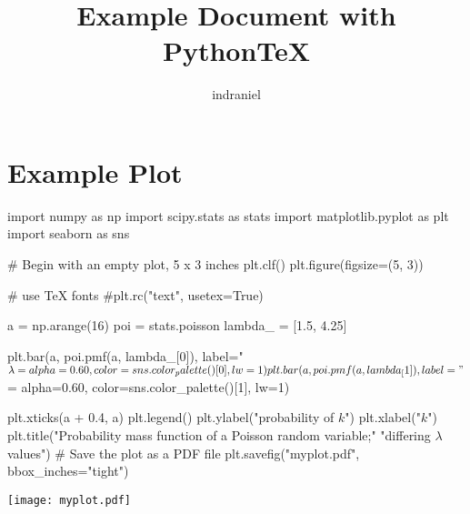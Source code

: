\documentclass{article}
\title{Example Document with Python\TeX}
\author{indraniel}
\begin{document}
\maketitle

\section{Example Plot}

\begin{pycode}
import numpy as np
import scipy.stats as stats
import matplotlib.pyplot as plt
import seaborn as sns

# Begin with an empty plot, 5 x 3 inches
plt.clf()
plt.figure(figsize=(5, 3))

# use TeX fonts
#plt.rc("text", usetex=True)

a = np.arange(16)
poi = stats.poisson
lambda_ = [1.5, 4.25]

plt.bar(a, poi.pmf(a, lambda_[0]),
        label="$\lambda = %
        alpha=0.60,
        color=sns.color_palette()[0],
        lw=1)

plt.bar(a, poi.pmf(a, lambda_[1]),
        label="$\lambda = %
        alpha=0.60,
        color=sns.color_palette()[1],
        lw=1)

plt.xticks(a + 0.4, a)
plt.legend()
plt.ylabel("probability of $k$")
plt.xlabel("$k$")
plt.title("Probability mass function of a Poisson random variable;"
          "differing $\lambda$ values\n")
# Save the plot as a PDF file
plt.savefig("myplot.pdf", bbox_inches="tight")
\end{pycode}

\begin{center}
    \texttt{[image: myplot.pdf]}
\end{center}
\end{document}
